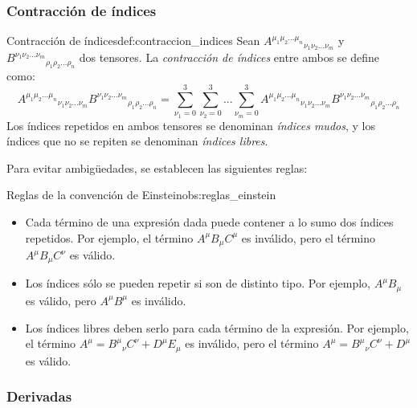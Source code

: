     \subsubsection{Contracción de índices}

        \begin{definicion}{Contracción de índices}{def:contraccion_indices}
            Sean ${A^{\mu_1\mu_2...\mu_n}}_{\nu_1\nu_2...\nu_m}$ y ${B^{\nu_1\nu_2...\nu_m}}_{\rho_1\rho_2...\rho_n}$ dos tensores. La \textit{contracción de índices} entre ambos se define como:
            \begin{equation}
                {A^{\mu_1\mu_2...\mu_n}}_{\nu_1\nu_2...\nu_m} {B^{\nu_1\nu_2...\nu_m}}_{\rho_1\rho_2...\rho_n} = \sum_{\nu_1 = 0}^{3} \sum_{\nu_2 = 0}^{3} ... \sum_{\nu_m = 0}^{3} {A^{\mu_1\mu_2...\mu_n}}_{\nu_1\nu_2...\nu_m} {B^{\nu_1\nu_2...\nu_m}}_{\rho_1\rho_2...\rho_n} \label{eq:contraccion_indices}
            \end{equation}
            Los índices repetidos en ambos tensores se denominan \textit{índices mudos}, y los índices que no se repiten se denominan \textit{índices libres}.
        \end{definicion}

        Para evitar ambigüedades, se establecen las siguientes reglas:

        \begin{observacion}{Reglas de la convención de Einstein}{obs:reglas_einstein}
            \begin{itemize}
                \item Cada término de una expresión dada puede contener a lo sumo dos índices repetidos. Por ejemplo, el término $A^\mu B_\mu C^\mu$ es inválido, pero el término $A^\mu B_\mu C^\nu$ es válido.
                \item Los índices sólo se pueden repetir si son de distinto tipo. Por ejemplo, $A^\mu B_\mu$ es válido, pero $A^\mu B^\mu$ es inválido.
                \item Los índices libres deben serlo para cada término de la expresión. Por ejemplo, el término $A^\mu = {B^\mu}_{\nu}C^\nu + D^\mu E_\mu$ es inválido, pero el término $A^\mu = {B^\mu}_{\nu}C^\nu + D^\mu$ es válido.
            \end{itemize}
        \end{observacion}

    \subsubsection{Derivadas}

